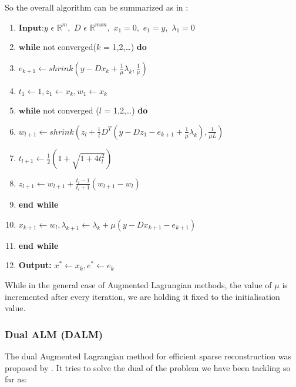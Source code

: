 \documentclass{article} %
\begin{document}
So the overall algorithm can be summarized as in \citep{yang2010fast}:

\begin{enumerate}
\item $\textbf{Input:}y$ $\epsilon$ $\mathbb{R}^m,$ $D$ $\epsilon$ $\mathbb{R}^{mxn},$ $x_1 = 0,$ $e_1 = y,$ $\lambda_1 = 0$
\item $\textbf{while}$ not converged($k$ = 1,2,\ldots) \textbf{do}
\item \hspace*{.4cm} $e_{k+1} \leftarrow shrink(y - Dx_k + \frac{1}{\mu}\lambda_k, \frac{1}{\mu})$
\item \hspace*{.4cm} $t_1 \leftarrow 1, z_1 \leftarrow x_k, w_1 \leftarrow x_k$
\item \hspace*{.4cm} $\textbf{while}$ not converged ($l$ = 1,2,\ldots) \textbf{do}
\item \hspace*{.8cm} $w_{l+1} \leftarrow shrink(z_l + \frac{1}{l}D^T(y - Dz_1 - e_{k+1} + \frac{1}{\mu}\lambda_k),\frac{1}{\mu L})$
\item \hspace*{.8cm} $t_{l+1} \leftarrow \frac{1}{2}(1 + \sqrt{1+4t_l^2})$
\item \hspace*{.8cm} $z_{l+1} \leftarrow w_{l+1} + \frac{t_l - 1}{t_l + 1}(w_{l+1} - w_l)$
\item \hspace*{.4cm} \textbf{end while}
\item \hspace*{.4cm} $x_{k+1} \leftarrow w_l, \lambda_{k+1} \leftarrow \lambda_k + \mu(y - Dx_{k+1} - e_{k+1})$
\item \textbf{end while}
\item \textbf{Output: } $x^{*} \leftarrow x_k, e^{*} \leftarrow e_k$
\end{enumerate}

While in the general case of Augmented Lagrangian methods, the value of $\mu$ is incremented after every iteration, we are holding it fixed to the initialisation value.


\subsubsection{Dual ALM (DALM)}

The dual Augmented Lagrangian method for efficient sparse reconstruction was proposed by \cite{tomioka2009dual}. It tries to solve the dual of the problem we have been tackling so far as:
\end{document}
